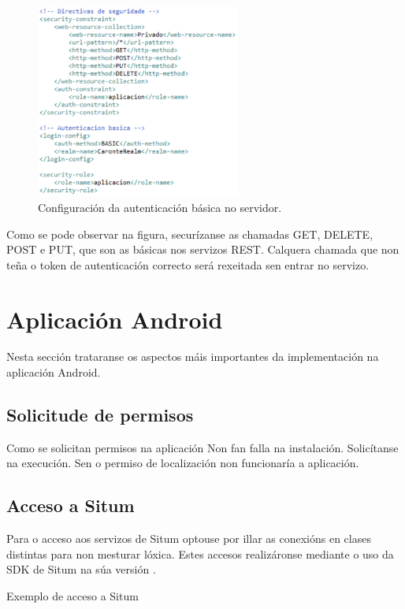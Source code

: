 \begin{figure}[htb] 
	\begin{center}
		\includegraphics[width=0.6\textwidth]{figures/codigo/configuracionAutenticacion}
		\caption{Configuración da autenticación básica no servidor.}
		\label{fig:configuracionAutenticacion}
	\end{center}
\end{figure}

Como se pode observar na figura, securízanse as chamadas GET, DELETE, POST e PUT, que son as básicas nos servizos REST. Calquera chamada que non teña o token de autenticación correcto será rexeitada sen entrar no servizo.


\section{Aplicación Android}
Nesta sección trataranse os aspectos máis importantes da implementación na aplicación Android.
\subsection{Solicitude de permisos}
Como se solicitan permisos na aplicación
Non fan falla na instalación. Solicítanse na execución. Sen o permiso de localización non funcionaría a aplicación.

\subsection{Acceso a Situm}
Para o acceso aos servizos de Situm optouse por illar as conexións en clases distintas para non mesturar lóxica. Estes accesos realizáronse mediante o uso da SDK de Situm na súa versión .

Exemplo de acceso a Situm

